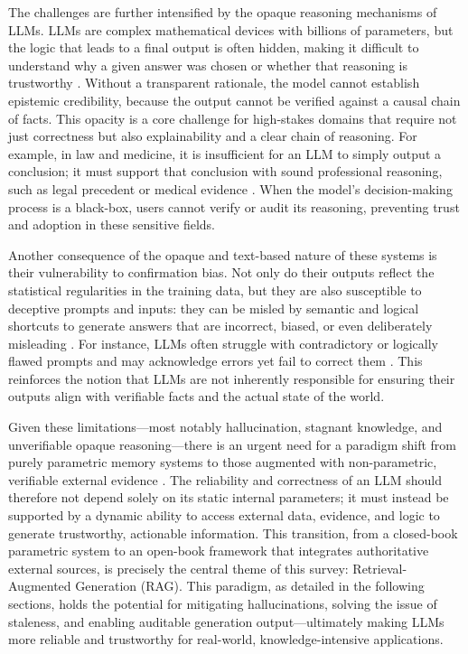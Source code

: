 \documentclass[11pt]{article}
\begin{document}
The challenges are further intensified by the opaque reasoning mechanisms of LLMs. LLMs are complex mathematical devices with billions of parameters, but the logic that leads to a final output is often hidden, making it difficult to understand why a given answer was chosen or whether that reasoning is trustworthy \cite{ref16,ref17}. Without a transparent rationale, the model cannot establish epistemic credibility, because the output cannot be verified against a causal chain of facts. This opacity is a core challenge for high-stakes domains that require not just correctness but also explainability and a clear chain of reasoning. For example, in law and medicine, it is insufficient for an LLM to simply output a conclusion; it must support that conclusion with sound professional reasoning, such as legal precedent or medical evidence \cite{ref18,ref9}. When the model's decision-making process is a black-box, users cannot verify or audit its reasoning, preventing trust and adoption in these sensitive fields.

Another consequence of the opaque and text-based nature of these systems is their vulnerability to confirmation bias. Not only do their outputs reflect the statistical regularities in the training data, but they are also susceptible to deceptive prompts and inputs: they can be misled by semantic and logical shortcuts to generate answers that are incorrect, biased, or even deliberately misleading \cite{ref19,ref20}. For instance, LLMs often struggle with contradictory or logically flawed prompts and may acknowledge errors yet fail to correct them \cite{ref21}. This reinforces the notion that LLMs are not inherently responsible for ensuring their outputs align with verifiable facts and the actual state of the world.

Given these limitations---most notably hallucination, stagnant knowledge, and unverifiable opaque reasoning---there is an urgent need for a paradigm shift from purely parametric memory systems to those augmented with non-parametric, verifiable external evidence \cite{ref22,ref16}. The reliability and correctness of an LLM should therefore not depend solely on its static internal parameters; it must instead be supported by a dynamic ability to access external data, evidence, and logic to generate trustworthy, actionable information. This transition, from a closed-book parametric system to an open-book framework that integrates authoritative external sources, is precisely the central theme of this survey: Retrieval-Augmented Generation (RAG). This paradigm, as detailed in the following sections, holds the potential for mitigating hallucinations, solving the issue of staleness, and enabling auditable generation output---ultimately making LLMs more reliable and trustworthy for real-world, knowledge-intensive applications.
\end{document}
